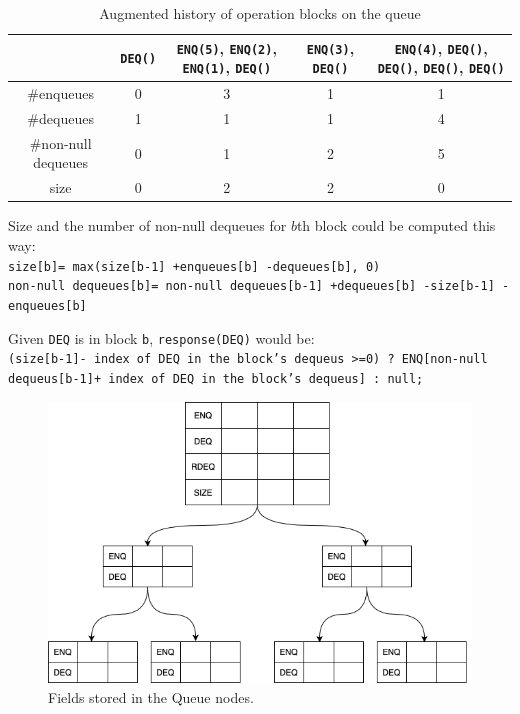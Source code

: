 \documentclass[10pt]{article}
\theoremstyle{definition}
\newtheorem{definition}[theorem]{Definition}
\begin{document}
\begin{table}[hbt]
\centering
  \begin{tabular}{c|c|c|c|c}
    \hline &\texttt{DEQ()} & \texttt{ENQ(5)}, \texttt{ENQ(2)}, \texttt{ENQ(1)}, \texttt{DEQ()}& \texttt{ENQ(3)}, \texttt{DEQ()}&  \texttt{ENQ(4)}, \texttt{DEQ()}, \texttt{DEQ()}, \texttt{DEQ()}, \texttt{DEQ()}\\ \hline
    \#enqueues & 0 & 3 & 1 & 1 \\ \hline
        \#dequeues & 1 & 1 & 1 & 4 \\ \hline
            \#non-null dequeues & 0 & 1 & 2 & 5 \\ \hline
                size & 0 & 2 & 2 & 0 \\ \hline
  \end{tabular}
  \caption{Augmented history of operation blocks on the queue}
\end{table}

%  
%  

Size and the number of non-null dequeues for $b$th block could be computed this way:\\
\texttt{size[b]= max(size[b-1] +enqueues[b] -dequeues[b], 0)}\\
\texttt{non-null dequeues[b]= non-null dequeues[b-1] +dequeues[b] -size[b-1] -enqueues[b]}

Given \texttt{DEQ} is in block \texttt{b}, \texttt{response(DEQ)} would be:\\
\texttt{(size[b-1]- index of DEQ in the block's dequeus >=0) ? ENQ[non-null dequeus[b-1]+ index of DEQ in the block's dequeus] : null;}


\begin{figure}[hbt]
\centering
  \includegraphics[width=5in]{pics/queue}
  \caption{Fields stored in the Queue nodes. \label{fig::queue}}
\end{figure}
\end{document}
